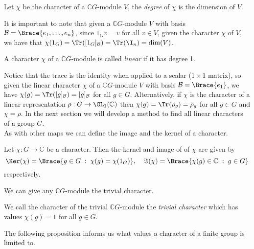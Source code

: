\documentclass[../Project.tex]{subfiles}
\begin{document}
\begin{defi}
	Let $\chi$ be the character of a $\mathbb{C}G$-module $V$, the \textit{degree} of $\chi$ is the dimension of $V$.
\end{defi}

It is important to note that given a $\mathbb{C}G$-module $V$ with basis $\mathcal{B} = \Brace{e_1,\dots,e_n}$, since $1_Gv = v$ for all $v \in V$, given the character $\chi$ of $V$, we have that $\chi(1_G) = \Tr([1_G]_\mathcal{B}) = \Tr(\I_n) = \dim(V)$.

\begin{defi}
	A character $\chi$ of a $\mathbb{C}G$-module is called \textit{linear} if it has degree 1. \\
\end{defi}

Notice that the trace is the identity when applied to a scalar ($1 \times 1$ matrix), so given the linear character $\chi$ of a $\mathbb{C}G$-module $V$ with basis $\mathcal{B} = \Brace{e_1}$, we have $\chi(g) = \Tr([g]_\mathcal{B}) = [g]_\mathcal{B}$ for all $g \in G$. Alternatively, if $\chi$ is the character of a linear representation $\rho : G \to \GL_1(\mathbb{C})$ then $\chi(g) = \Tr(\rho_g) = \rho_g$ for all $g \in G$ and $\chi = \rho$. In the next section we will develop a method to find all linear characters of a group $G$.\\


As with other maps we can define the image and the kernel of a character.
\begin{defi}
	Let $\chi : G \to \mathbb{C}$ be a character. Then the kernel and image of of $\chi$ are given by
	$$\Ker(\chi) = \Brace{g \in G \;:\; \chi(g) = \chi(1_G)},\quad \Im(\chi) = \Brace{\chi(g) \in \mathbb{C}\;:\;g  \in G}$$
	respectively.\\
\end{defi}

We can give any $\mathbb{C}G$-module the trivial character.
\begin{defi}
	We call the character of the trivial $\mathbb{C}G$-module the \textit{trivial character} which has values $\chi(g) = 1$ for all $g \in G$.\\
\end{defi}

The following proposition informs us what values a character of a finite group is limited to.
\end{document}
